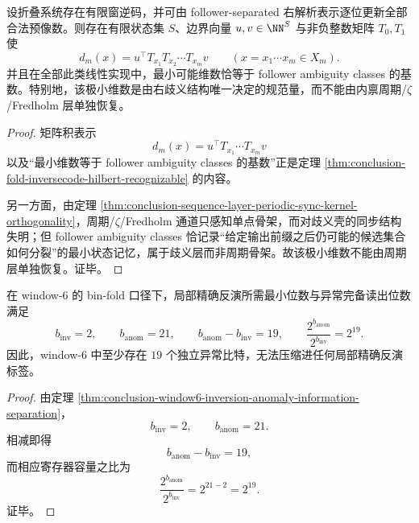 \begin{theorem}\label{thm:conclusion-sequence-layer-fiber-counting-minimal-state-not-periodically-recoverable}
设折叠系统存在有限窗逆码，并可由 follower-separated 右解析表示逐位更新全部合法预像数。则存在有限状态集 \(S\)、边界向量 \(u,v\in\NN^S\) 与非负整数矩阵 \(T_0,T_1\) 使
\[
d_m(x)=u^\top T_{x_1}T_{x_2}\cdots T_{x_m}v
\qquad
(x=x_1\cdots x_m\in X_m).
\]
并且在全部此类线性实现中，最小可能维数恰等于 follower ambiguity classes 的基数。特别地，该极小维数是由右歧义结构唯一决定的规范量，而不能由内禀周期/\(\zeta\)/Fredholm 层单独恢复。
\end{theorem}
\begin{proof}
矩阵积表示
\[
d_m(x)=u^\top T_{x_1}\cdots T_{x_m}v
\]
以及“最小维数等于 follower ambiguity classes 的基数”正是定理 \ref{thm:conclusion-fold-inversecode-hilbert-recognizable} 的内容。

另一方面，由定理 \ref{thm:conclusion-sequence-layer-periodic-sync-kernel-orthogonality}，周期/\(\zeta\)/Fredholm 通道只感知单点骨架，而对歧义壳的同步结构失明；但 follower ambiguity classes 恰记录“给定输出前缀之后仍可能的候选集合如何分裂”的最小状态记忆，属于歧义层而非周期骨架。故该极小维数不能由周期层单独恢复。证毕。
\end{proof}

\begin{corollary}\label{cor:conclusion-sequence-layer-window6-nineteen-bit-orthogonal-splitting}
在 window-\(6\) 的 bin-fold 口径下，局部精确反演所需最小位数与异常完备读出位数满足
\[
b_{\mathrm{inv}}=2,
\qquad
b_{\mathrm{anom}}=21,
\qquad
b_{\mathrm{anom}}-b_{\mathrm{inv}}=19,
\qquad
\frac{2^{b_{\mathrm{anom}}}}{2^{b_{\mathrm{inv}}}}=2^{19}.
\]
因此，window-\(6\) 中至少存在 \(19\) 个独立异常比特，无法压缩进任何局部精确反演标签。
\end{corollary}
\begin{proof}
由定理 \ref{thm:conclusion-window6-inversion-anomaly-information-separation}，
\[
b_{\mathrm{inv}}=2,
\qquad
b_{\mathrm{anom}}=21.
\]
相减即得
\[
b_{\mathrm{anom}}-b_{\mathrm{inv}}=19,
\]
而相应寄存器容量之比为
\[
\frac{2^{b_{\mathrm{anom}}}}{2^{b_{\mathrm{inv}}}}
=
2^{21-2}
=
2^{19}.
\]
证毕。
\end{proof}

